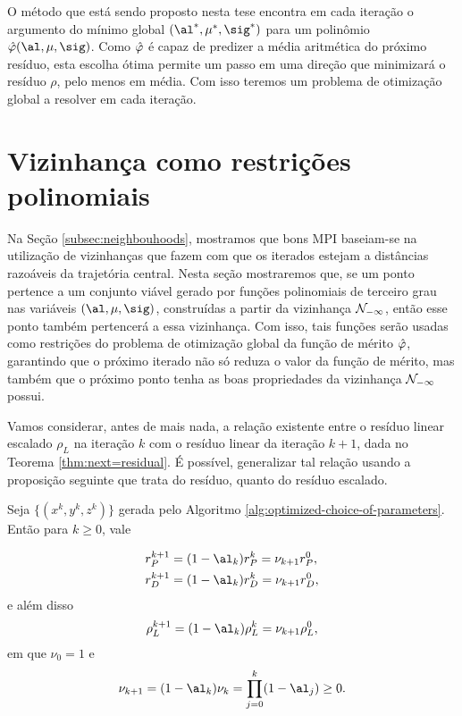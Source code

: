 O método que está sendo proposto nesta tese encontra em cada iteração o
argumento do mínimo global $(\al^*,\mu^*,\sig^*)$ para um polinômio
 $\nextphi(\al,\mu,\sig)$. Como $\hat{\varphi}$ é capaz de predizer a média
 aritmética do próximo resíduo, esta escolha ótima permite um passo em uma
 direção que minimizará  o resíduo $\rho$, pelo menos em média. Com isso
 teremos um problema de otimização global a resolver em cada iteração.
 
 
 \section{Vizinhança como restrições polinomiais}
 Na Seção \ref{subsec:neighbouhoods}, mostramos que bons \acl{MPI} baseiam-se na
  utilização de vizinhanças que fazem com que os iterados estejam a distâncias
  razoáveis da trajetória central. Nesta seção mostraremos  que, se um
  ponto pertence a um conjunto viável  gerado por funções polinomiais de terceiro grau 
  nas variáveis $(\al,\mu,\sig)$, construídas a
  partir da vizinhança  $\mathcal{N}_{-\infty}$, então esse ponto  também pertencerá
  a essa vizinhança.
  Com isso, tais funções serão usadas como restrições do problema de otimização
  global da função de mérito $\hat{\varphi}$, garantindo que o próximo
  iterado não só reduza o valor da função de mérito, mas também que o próximo
  ponto tenha as boas propriedades  da  vizinhança $\mathcal{N}_{-\infty}$ possui.
  
  




Vamos considerar, antes de mais nada, a relação existente entre o resíduo linear escalado $\rho_L$ na iteração $k$ com o resíduo 
linear da iteração $k+1$, dada no Teorema \ref{thm:next=residual}. É possível, generalizar tal relação usando a  proposição seguinte que trata do resíduo, quanto do resíduo escalado. 
\begin{prop}\label{prop:nu_k}
 Seja $\{(x^k,y^k,z^k)\}$ gerada pelo Algoritmo \ref{alg:optimized-choice-of-parameters}. Então para $k\geq0$, vale  

\begin{equation}
\label{eq:residual-norm-relation-nonscaled}
\begin{aligned}
 r_P^{k+1}  & = (1-\alk) r_P^{k} = \nu_{k+1}  r_P^{0}, \\
  r_D^{k+1}  & = (1-\alk) r_D^{k} = \nu_{k+1}  r_D^{0}, \\
\end{aligned}
\end{equation}
e além disso
\begin{equation}
\label{eq:residual-norm-relation}
 \rho_L^{k+1}  = (1-\alk) \rho_L^{k} = \nu_{k+1}  \rho_L^{0},
\end{equation}
em que  $\nu_0 = 1$ e 
\begin{equation}
	\label{eq:nu_k+1}
\nu_{k+1} = (1-\alk)\nuk = \prod_{j=0}^{k}(1-\al_j) \geq 0.
\end{equation}
\end{prop}


